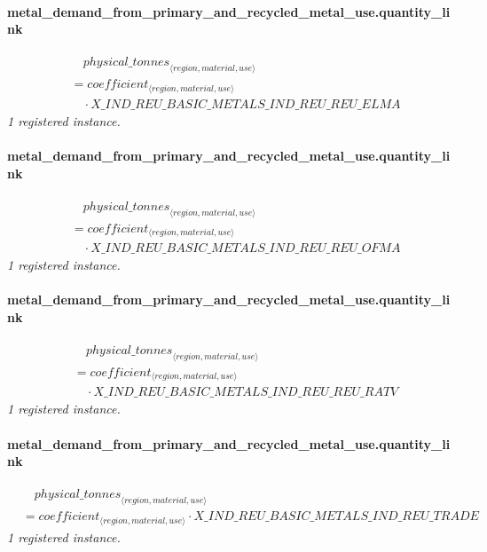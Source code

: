 \documentclass[11pt]{article}
\begin{document}
\paragraph{metal\_demand\_from\_primary\_and\_recycled\_metal\_use.quantity\_link}
\begin{align*}
&\quad {physical\_tonnes}_{\langle region, material, use\rangle}\\
&= coefficient_{\langle region, material, use\rangle}\\
&\quad {}\cdot X\_IND\_REU\_BASIC\_METALS\_IND\_REU\_REU\_ELMA
\end{align*}
\noindent\emph{1 registered instance.}\par
\paragraph{metal\_demand\_from\_primary\_and\_recycled\_metal\_use.quantity\_link}
\begin{align*}
&\quad {physical\_tonnes}_{\langle region, material, use\rangle}\\
&= coefficient_{\langle region, material, use\rangle}\\
&\quad {}\cdot X\_IND\_REU\_BASIC\_METALS\_IND\_REU\_REU\_OFMA
\end{align*}
\noindent\emph{1 registered instance.}\par
\paragraph{metal\_demand\_from\_primary\_and\_recycled\_metal\_use.quantity\_link}
\begin{align*}
&\quad {physical\_tonnes}_{\langle region, material, use\rangle}\\
&= coefficient_{\langle region, material, use\rangle}\\
&\quad {}\cdot X\_IND\_REU\_BASIC\_METALS\_IND\_REU\_REU\_RATV
\end{align*}
\noindent\emph{1 registered instance.}\par
\paragraph{metal\_demand\_from\_primary\_and\_recycled\_metal\_use.quantity\_link}
\begin{align*}
&\quad {physical\_tonnes}_{\langle region, material, use\rangle}\\
&= coefficient_{\langle region, material, use\rangle} \cdot X\_IND\_REU\_BASIC\_METALS\_IND\_REU\_TRADE
\end{align*}
\noindent\emph{1 registered instance.}\par
\end{document}
